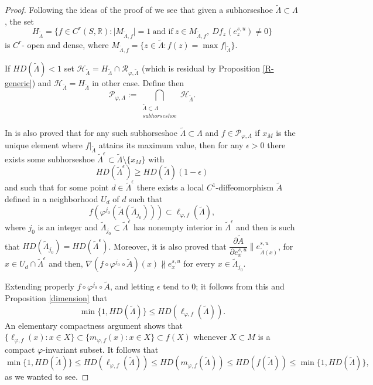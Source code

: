\documentclass[12pt]{amsart}
\providecommand{\abs}[1]{\lvert#1\rvert}
\theoremstyle{plain} %
\theoremstyle{definition} %
\numberwithin{equation}{section}
\begin{document}
\begin{proof}
Following the ideas of the proof of \cite[Theorem 1]{MR2} we see that given a subhorseshoe $\widetilde{\Lambda}\subset\Lambda$, the set 
$$H_{\widetilde{\Lambda}}=\{f\in C^r(S,\mathbb{R}): \abs{M_{\widetilde{\Lambda}, f}}=1\ \text{and if}\ z\in M_{\widetilde{\Lambda}, f},\ Df_z(e^{s,u}_z)\neq 0  \}$$
is $C^r$- open and dense, where $M_{\widetilde{\Lambda}, f}= \{z\in \widetilde{\Lambda}: f(z)=\max f|_{\tilde{\Lambda}} \}$.

If $HD(\tilde{\Lambda})<1$ set $\mathcal{H}_{\widetilde{\Lambda}}=H_{\widetilde{\Lambda}}\cap \mathcal{R}_{\varphi,\tilde{\Lambda}}$ (which is residual by Proposition \ref{R-generic}) and $\mathcal{H}_{\widetilde{\Lambda}}=H_{\widetilde{\Lambda}}$ in other case. Define then  
$$\mathcal{P}_{\varphi,\Lambda}:= \bigcap \limits_{ \substack{\widetilde{\Lambda}\subset\Lambda\  \\ subhorseshoe}}\mathcal{H}_{\widetilde{\Lambda}}.$$

In \cite{MR2} is also proved that for any such subhorseshoe $\widetilde{\Lambda}\subset\Lambda$ and $f \in \mathcal{P}_{\varphi,\Lambda}$ if $x_M$ is the unique element where $f|_{\widetilde{\Lambda}}$ attains its maximum value, then for any $\epsilon>0$ there exists some subhorseshoe $\widetilde{\Lambda}^{\epsilon}\subset \widetilde{\Lambda} \setminus \{ x_M\}$ with 
$$HD(\widetilde{\Lambda}^{\epsilon})\geq HD(\widetilde{\Lambda})(1-\epsilon)$$ 
and such that for some point $d\in \widetilde{\Lambda}^{\epsilon}$ there exists a local $C^{1}$-diffeomorphism $\tilde{A}$ defined in a neighborhood $U_{d}$ of $d$ such that 
$$f(\varphi^{j_0}(\tilde{A}(\tilde{\Lambda}_{j_0})))\subset \ell_{\varphi,f}(\widetilde{\Lambda}),$$
where $j_{0}$ is an integer and $\tilde{\Lambda}_{j_0}\subset \widetilde{\Lambda}^{\epsilon}$ has nonempty interior in $\widetilde{\Lambda}^{\epsilon}$ and then is such that $HD(\tilde{\Lambda}_{j_0})=HD(\widetilde{\Lambda}^{\epsilon})$. Moreover, it is also proved that $\dfrac{\partial \tilde{A}}{\partial e_{x}^{s,u}}\parallel e^{s,u}_{\tilde{A}(x)}$, for $x\in U_{d}\cap  \widetilde{\Lambda}^{\epsilon}$ and then, $\nabla (f\circ \varphi^{j_{0}} \circ \tilde{A})(x)\nparallel e_{x}^{s,u}$ for every $x \in \tilde{\Lambda}_{j_0}$.

Extending properly $f\circ \varphi^{j_{0}} \circ \tilde{A}$, and letting $\epsilon$ tend to $0$; it follows from this and Proposition \ref{dimension} that
$$ \min\{1,HD(\tilde{\Lambda})\}\leq HD(\ell_{\varphi,f}(\widetilde{\Lambda})).$$
An elementary compactness argument shows that  $\{\ell_{\varphi, f}(x):x\in X\}\subset\{m_{\varphi, f}(x): x\in X\}\subset f(X)$
whenever $X\subset M$ is a compact $\varphi$-invariant subset. It follows that
$$\min\{1,HD(\tilde{\Lambda})\}\leq HD(\ell_{\varphi,f}(\widetilde{\Lambda})) \leq HD(m_{\varphi,f}(\widetilde{\Lambda})) \leq HD(f(\widetilde{\Lambda})) \leq \min\{1,HD(\tilde{\Lambda})\},$$
as we wanted to see.
\end{proof}
\end{document}
